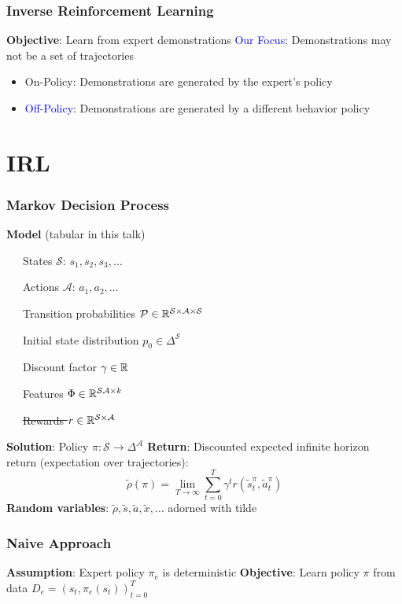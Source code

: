\documentclass{beamer}
\begin{document}
\begin{frame}
	\frametitle{Inverse Reinforcement Learning}
	\textbf{Objective}: Learn from expert demonstrations
	\vfill
	\textcolor{blue}{Our Focus}: Demonstrations may not be a set of trajectories
	\begin{itemize}
		\item On-Policy: Demonstrations are generated by the expert's policy
		\item \textcolor{blue}{Off-Policy}: Demonstrations are generated by a different behavior policy
	\end{itemize}
\end{frame}



\section*{IRL}

\begin{frame} \frametitle{Markov Decision Process}
  \textbf{Model} (tabular in this talk) \par
    {\small
   ~~~States $\mathcal{S}$: $s_1, s_2, s_3, \dots $ \par
   ~~~Actions $\mathcal{A}$: $a_1, a_2, \dots $ \par
   ~~~Transition probabilities $\mathcal{P} \in \mathbb{R}^{\mathcal{S} \times \mathcal{A} \times \mathcal{S} }$ \par
   ~~~Initial state distribution $p_0 \in \Delta^\mathcal{S}$ \par
   ~~~Discount factor $\gamma \in \mathbb{R}$ \par
   ~~~Features $\Phi \in \mathbb{R}^{\mathcal{S} \mathcal{A} \times k}$ \par
   ~~~\sout{Rewards $r \in \mathbb{R}^{\mathcal{S} \times \mathcal{A}}$}}
    \vfill 
    \textbf{Solution}: Policy ${\pi}\colon \mathcal{S} \to \Delta^\mathcal{A}$
    \vfill
    \textbf{Return}: Discounted expected infinite horizon return (expectation over trajectories):
    \[
	    \tilde{\rho}(\pi) = \lim_{T \to \infty} \sum_{t=0}^T \gamma^t r(\tilde{s}^{\pi}_t, \tilde{a}^{{\pi}}_t)
    \]
    \vfill
    \textbf{Random variables}: $\tilde{\rho}, \tilde{s}, \tilde{a}, \tilde{x}, \dots $ adorned with tilde
\end{frame}

\begin{frame} \frametitle{Naive Approach}
	\textbf{Assumption}: Expert policy $\pi_e$ is deterministic
	\vfill
	\textbf{Objective}: Learn policy $\pi$ from data $D_e = {(s_t, \pi_e(s_t))}_{t=0}^{T}$
	\vfill
\end{frame}
\end{document}
